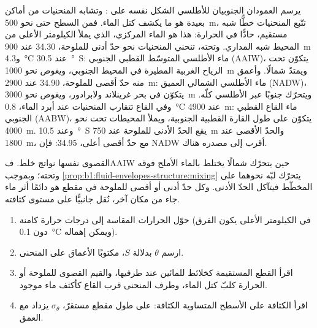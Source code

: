 يرسم العمودان الجنوبيان للأطلسي الشكل نفسه على : وتشابه المنحنيات من أماكن بعيدة هو ما يكشف كتل الماء. فمن السطح حتى نحو \qty{500}{m}، تتّبع المنحنيات خطًّا شبه مستقيم، حادًّا في الحرارة: هذا هو الماء المركزي، الذي يملأ الكيلومتر الأعلى من المحيط شبه المداري. وتحته، تنحني المنحنيات نحو حدّ أدنى للملوحة، \num{34.30} عند \qty{900}{m} و\qty{4.3}{\celsius} عند \qty{30.5}{\degree S}: ماء الأطلسي المتوسّط القطبي الجنوبي (AAIW)، يتكوّن تحت الرياح الغربية المطيرة في المحيط الجنوبي، ويغوص نحو \qty{1000}{m} ويمتدّ شمالًا. وأعمق منه حدّ أقصى للملوحة، \num{34.90} عند \qty{2900}{m}: ماء الأطلسي الشمالي العميق (NADW)، يتكوّن في بحر غرينلاند ولابرادور، ويغوص نحو \qty{3000}{m} ويتحرّك جنوبًا عبر الأطلسي كلّه. وفي القاع تتقارب المنحنيات عند أبرد الماء، \qty{0.8}{\celsius} عند \qty{4900}{m}: ماء القاع القطبي الجنوبي (AABW)، يتكوّن على طول القارة القطبية الجنوبية، ويملأ المحيطات تحت نحو \qty{4000}{m}. وعند \qty{10.5}{\degree S} يقع الحدّ الأدنى للملوحة عند \qty{750}{m} والحدّ الأقصى عند \qty{1800}{m}، مع حدّ أقصى أعلى، \num{34.95}: فإن NADW أقرب إلى مصدره هناك.

 القصوى نفسها نواتج خلط. فAAIW حين يتحرّك شمالًا يختلط بالماء الأملح فوقه وتحته؛ وبموجب \cref{prop:b1:fluid-envelopes-structure:mixing} يتحرّك لبّه نحوهما على المخطّط فيتآكل الحدّ الأدنى. وكل حدّ أدنى أو أقصى للملوحة في مقطع هو دائمًا أثر ماء جاء من مكان آخر، نُقل جانبيًّا على مستوى كثافته.

\begin{method}\label{met:b1:fluid-envelopes-structure:ts}
\begin{enumerate}
  \item حوّل الحرارات المقاسة إلى درجات حرارة كامنة (في الكيلومتر الأعلى يكون الفرق دون \qty{0.1}{\celsius} ويمكن إهماله).
  \item ارسم $\theta$ بدلالة $S$، مكتوبًا الأعماق على المنحنى.
  \item اقرأ القطع المستقيمة كخلائط للمائين عند طرفيها، والقيم القصوى للملوحة أو الحرارة كلبّ كتل الماء، وطرف المنحنى قرب القاع كأكثف ماء موجود.
  \item اقرأ الكثافة على الأسطح المتساوية الكثافة: على طول مقطع مستقرّ، $\sigma_\theta$ يزداد مع العمق.
\end{enumerate}
\end{method}

